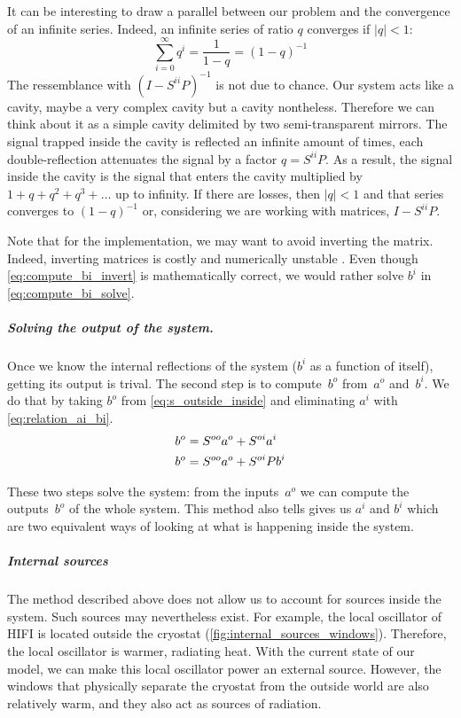 It can be interesting to draw a parallel between our problem and the convergence of an infinite series.
Indeed, an infinite series of ratio $q$ converges if $\vert q \vert < 1$:
\begin{equation}
    \sum_{i=0}^\infty q^i = \frac{1}{1-q} = (1-q)^{-1}
\end{equation}
The ressemblance with $(I - S^{ii}P)^{-1}$ is not due to chance.
Our system acts like a cavity, maybe a very complex cavity but a cavity nontheless.
Therefore we can think about it as a simple cavity delimited by two semi-transparent mirrors.
The signal trapped inside the cavity is reflected an infinite amount of times, each double-reflection attenuates the signal by a factor $q=S^{ii}P$.
As a result, the signal inside the cavity is the signal that enters the cavity multiplied by $1+q+q^2+q^3+\dots$ up to infinity.
If there are losses, then $|q|<1$ and that series converges to $(1-q)^{-1}$ or, considering we are working with matrices, $I - S^{ii}P$.

Note that for the implementation, we may want to avoid inverting the matrix.
Indeed, inverting matrices is costly and numerically unstable .
Even though \cref{eq:compute_bi_invert} is mathematically correct, we would rather solve $b^i$ in \cref{eq:compute_bi_solve}.

\subparagraph{Solving the output of the system.}
Once we know the internal reflections of the system ($b^i$ as a function of itself), getting its output is trival.
The second step is to compute~$b^o$ from~$a^o$ and~$b^i$.
We do that by taking $b^o$ from \cref{eq:s_outside_inside} and eliminating $a^i$ with \cref{eq:relation_ai_bi}.
\begin{align}
    b^o &= S^{oo}a^o + S^{oi}a^i \notag \\
    b^o &= S^{oo}a^o + S^{oi}Pb^i \label{eq:compute_bo}
\end{align}

These two steps solve the system: from the inputs~$a^o$ we can compute the outputs~$b^o$ of the whole system.
This method also tells gives us $a^i$ and $b^i$ which are two equivalent ways of looking at what is happening inside the system.

\subparagraph{Internal sources}
The method described above does not allow us to account for sources inside the system.
Such sources may nevertheless exist.
For example, the local oscillator of HIFI is located outside the cryostat (\cref{fig:internal_sources_windows}).
Therefore, the local oscillator is warmer, radiating heat.
With the current state of our model, we can make this local oscillator power an external source.
However, the windows that physically separate the cryostat from the outside world are also relatively warm, and they also act as sources of radiation.

